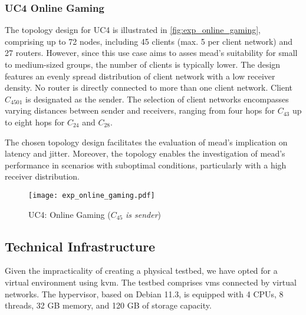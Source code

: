 \subsubsection{UC4 Online Gaming} %
\label{par:EX4 Online Gaming}
The topology design for UC4 is illustrated in \autoref{fig:exp_online_gaming},
    comprising up to 72 nodes, including 45 clients (max. 5 per client network)
    and 27 routers.
However, since this use case aims to asses \gls{mead}'s suitability for small
    to medium-sized groups, the number of clients is typically lower.
The design features an evenly spread distribution of client network with a low
    receiver density.
No router is directly connected to more than one client network.
Client $C_{4501}$ is designated as the sender.
The selection of client networks encompasses varying distances between sender
    and receivers, ranging from four hops for $C_{43}$ up to eight hops for
    $C_{24}$ and $C_{28}$.

The chosen topology design facilitates the evaluation of \gls{mead}'s
    implication on latency and jitter.
Moreover, the topology enables the investigation of \gls{mead}'s performance in
    scenarios with suboptimal conditions, particularly with a high receiver
    distribution.

\begin{figure}
    \begin{center}
        \texttt{[image: exp\_online\_gaming.pdf]}
    \end{center}
    \caption[UC4: Online Gaming]{UC4: Online Gaming ($C_{45}$ \textit{is sender})}
    \label{fig:exp_online_gaming}
\end{figure}


\subsection{Technical Infrastructure} %
\label{sub:Technical Infrastructure}
Given the impracticality of creating a physical testbed, we have opted for a 
    virtual environment using \gls{kvm}.
The testbed comprises \glspl{vm} connected by virtual networks.
The hypervisor, based on Debian 11.3, is equipped with 4 CPUs, 8 threads, 32 GB
    memory, and 120 GB of storage capacity.

